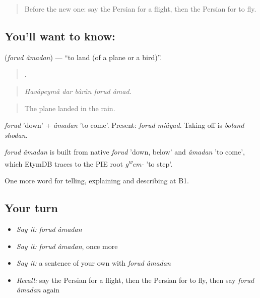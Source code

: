 \label{lesson:FA-C431-forud-amadan}



\begin{quote}
Before the new one: say the Persian for a flight, then the Persian for to fly.
\end{quote}

\subsection*{You'll want to know:  }
\textbf{ } (\emph{forud âmadan}) — \textquotedblleft{}to land (of a plane or a bird)\textquotedblright{}.

\begin{quote}
    .
\end{quote}

\begin{quote}
\emph{Havâpeymâ dar bârân forud âmad.}
\end{quote}

\begin{quote}
The plane landed in the rain.
\end{quote}

\emph{forud} 'down' + \emph{âmadan} 'to come'. Present: \emph{forud miâyad}. Taking off is \emph{boland shodan}.

\begin{cousinweb}
\emph{forud âmadan} is built from native \emph{forud} 'down, below' and \emph{âmadan} 'to come', which EtymDB traces to the PIE root \emph{g\textsuperscript{w}em-} 'to step'.
\end{cousinweb}

\begin{grammarlens}[title={What you've built}]
One more word for telling, explaining and describing at B1.
\end{grammarlens}

\subsection*{Your turn}
\begin{itemize}
\raggedright
  \item \emph{Say it:} \emph{forud âmadan}
  \item \emph{Say it:} \emph{forud âmadan}, once more
  \item \emph{Say it:} a sentence of your own with \emph{forud âmadan}
  \item \emph{Recall:} say the Persian for a flight, then the Persian for to fly, then say \emph{forud âmadan} again
\end{itemize}

